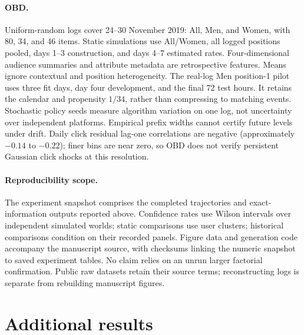 \documentclass[sigconf,review,anonymous]{acmart}
\begin{document}
\paragraph{OBD.} Uniform-random logs cover 24--30 November 2019: All, Men, and Women, with 80, 34, and 46 items. Static simulations use All/Women, all logged positions pooled, days 1--3 construction, and days 4--7 estimated rates. Four-dimensional audience summaries and attribute metadata are retrospective features. Means ignore contextual and position heterogeneity. The real-log Men position-1 pilot uses three fit days, day four development, and the final 72 test hours. It retains the calendar and propensity $1/34$, rather than compressing to matching events. Stochastic policy seeds measure algorithm variation on one log, not uncertainty over independent platforms. Empirical prefix widths cannot certify future levels under drift. Daily click residual lag-one correlations are negative (approximately $-0.14$ to $-0.22$); finer bins are near zero, so OBD does not verify persistent Gaussian click shocks at this resolution.

\paragraph{Reproducibility scope.} The experiment snapshot comprises the completed trajectories and exact-information outputs reported above. Confidence rates use Wilson intervals over independent simulated worlds; static comparisons use user clusters; historical comparisons condition on their recorded panels. Figure data and generation code accompany the manuscript source, with checksums linking the numeric snapshot to saved experiment tables. No claim relies on an unrun larger factorial confirmation. Public raw datasets retain their source terms; reconstructing logs is separate from rebuilding manuscript figures.

\section{Additional results}\label{app:extra}
\end{document}
